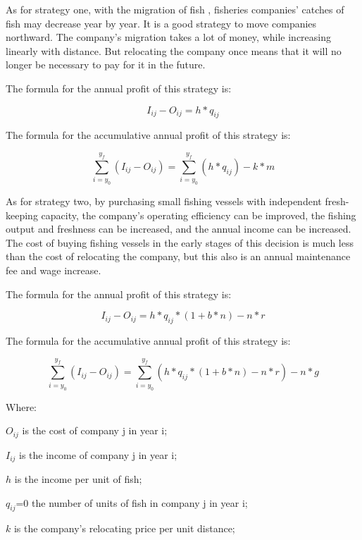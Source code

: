 \documentclass{mcmthesis}
\numberwithin{figure}{section}
\numberwithin{table}{section}
\begin{document}
As for strategy one, with the migration of fish , fisheries companies' catches of fish may decrease year by year. It is a good strategy to move companies northward. The company's migration takes a lot of money, while increasing linearly with distance. But relocating the company once means that it will no longer be necessary to pay for it in the future.

The formula for the annual profit of this strategy is:

\begin{equation}\label{1}
  I_{ij} - O_{ij} = h * q_{ij}
  \end{equation}

The formula for the accumulative annual profit of this strategy is:

\begin{equation}\label{2}
  \sum_{i=y_0}^{y_f} (I_{ij} - O_{ij}) = \sum_{i=y_0}^{y_f} (h * q_{ij}) - k*m
  \end{equation}
  
As for strategy two, by purchasing small fishing vessels with independent fresh-keeping capacity, the company's operating efficiency can be improved, the fishing output and freshness can be increased, and the annual income can be increased. The cost of buying fishing vessels in the early stages of this decision is much less than the cost of relocating the company, but this also is an annual maintenance fee and wage increase.

The formula for the annual profit of this strategy is:

\begin{equation}\label{3}
  I_{ij} - O_{ij} = h * q_{ij} * (1+b*n) - n*r
  \end{equation}

The formula for the accumulative annual profit of this strategy is:

\begin{equation}\label{4}
  \sum_{i=y_0}^{y_f} (I_{ij} - O_{ij}) = \sum_{i=y_0}^{y_f} (h * q_{ij}* (1+b*n) - n * r ) - n * g
\end{equation}
  

Where:

$O_{ij}$ is the cost of company j in year i;

$I_{ij}$ is the income of company j in year i;

$h$ is the income per unit of fish;

$q_{ij}$=0 the number of units of fish in company j in year i;

$k$ is the company's relocating price per unit distance;
\end{document}
